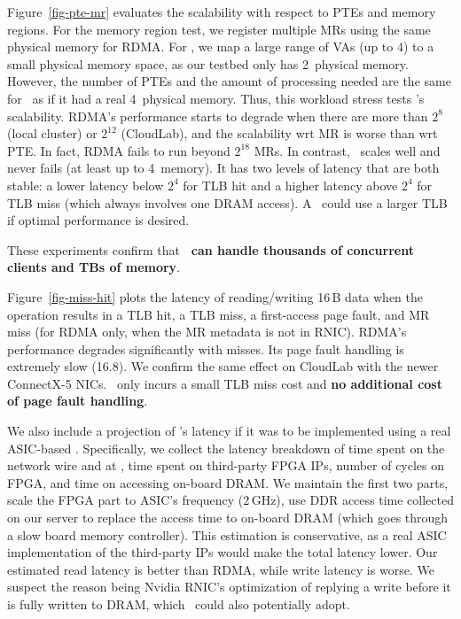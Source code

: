 Figure~\ref{fig-pte-mr} evaluates the scalability with respect to PTEs and memory regions.
For the memory region test, we register multiple MRs using the same physical memory for RDMA.
For \sys, we map a large range of VAs (up to 4\TB) to a small physical memory space, as our testbed only has 2\GB\ physical memory.
However, the number of PTEs and the amount of processing needed are the same for \sysboard\ as if it had a real 4\TB\ physical memory.
Thus, this workload stress tests \sysboard's scalability.
RDMA's performance starts to degrade when there are more than $2^8$ (local cluster) or $2^{12}$ (CloudLab),
and the scalability wrt MR is worse than wrt PTE.
In fact, RDMA fails to run beyond $2^{18}$ MRs.
In contrast, \sys\ scales well and never fails (at least up to 4\TB\ memory).
It has two levels of latency that are both stable: a lower latency below $2^4$ for TLB hit and a higher latency above $2^4$ for TLB miss (which always involves one DRAM access).
A \sysboard\ could use a larger TLB if optimal performance is desired.

These experiments confirm that \textbf{\sys\ can handle thousands of concurrent clients and TBs of memory}.



Figure~\ref{fig-miss-hit} plots the latency of reading/writing 16\,B data 
when the operation results in a TLB hit, a TLB miss, a first-access page fault, and MR miss (for RDMA only, when the MR metadata is not in RNIC).
RDMA's performance degrades significantly with misses.
Its page fault handling is extremely slow (16.8\ms).
We confirm the same effect on CloudLab with the newer ConnectX-5 NICs.
\sys\ only incurs a small TLB miss cost and \textbf{no additional cost of page fault handling}.

We also include a projection of \sys's latency if it was to be implemented using a real ASIC-based \sysboard.
Specifically, we collect the latency breakdown of time spent on the network wire and at \CN, time spent on third-party FPGA IPs,
number of cycles on FPGA, and time on accessing on-board DRAM.
We maintain the first two parts, scale the FPGA part to ASIC's frequency (2\,GHz), use DDR access time collected on our server to replace the access time to on-board DRAM (which 
goes through a slow board memory controller).
This estimation is conservative, as a real ASIC implementation of the third-party IPs would make the total latency lower.
Our estimated read latency is better than RDMA, while write latency is worse.
We suspect the reason being Nvidia RNIC's optimization of replying a write before it is fully written to DRAM, which \sys\ could also potentially adopt.

